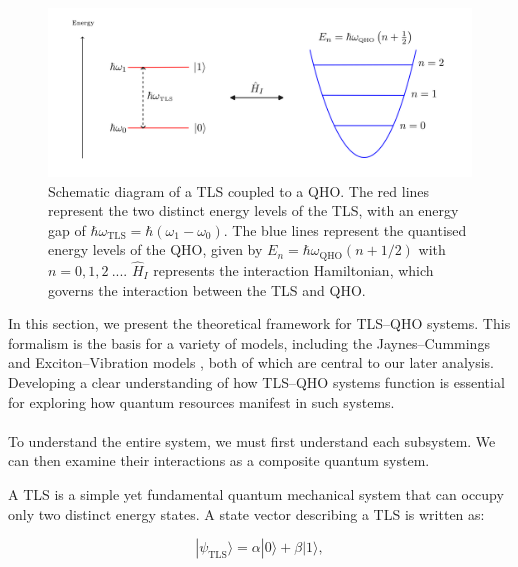 \documentclass[11pt]{article}
\begin{document}
\begin{figure}[h]
    \centering
    \includegraphics[]{Images/TLSQHO.png}
    \caption{Schematic diagram of a TLS coupled to a QHO. The red lines represent the two distinct energy levels of the TLS, with an energy gap of $\hbar\omega_{\scriptscriptstyle \text{TLS}} = \hbar\left(\omega_1 - \omega_0\right)$. The blue lines represent the quantised energy levels of the QHO, given by $E_n = \hbar\omega_{\scriptscriptstyle \text{QHO}}\left(n+1/2\right)$ with $n=0,1,2\ ...$. $\hat{H}_I$ represents the interaction Hamiltonian, which governs the interaction between the TLS and QHO.}
    \label{img:TLSQHO}
\end{figure}

\noindent In this section, we present the theoretical framework for TLS--QHO systems. This formalism is the basis for a variety of models, including the Jaynes--Cummings and Exciton--Vibration models \cite{Hamiltonian2012-JC_Friction, ExVib2015-ChemPhysBorn}, both of which are central to our later analysis. Developing a clear understanding of how TLS--QHO systems function is essential for exploring how quantum resources manifest in such systems. \\
\\
To understand the entire system, we must first understand each subsystem. We can then examine their interactions as a composite quantum system.

A TLS is a simple yet fundamental quantum mechanical system that can occupy only two distinct energy states. A state vector describing a TLS is written as:

\begin{equation}
    |\psi_{\scriptscriptstyle \text{TLS}}\rangle = \alpha|0\rangle + \beta|1\rangle,
\end{equation}
\end{document}
